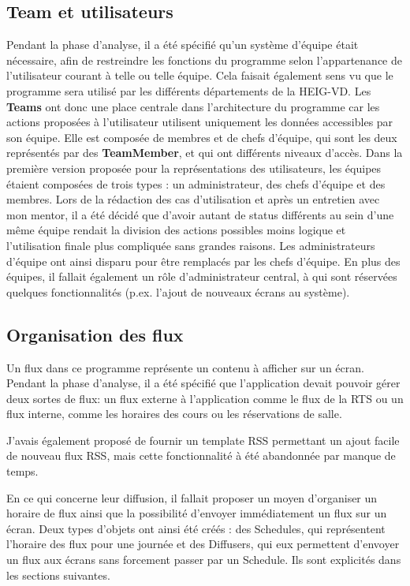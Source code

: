 \documentclass[french]{article}
\begin{document}
\subsection{Team et utilisateurs}
Pendant la phase d'analyse, il a été spécifié qu'un système d'équipe était nécessaire, afin de restreindre les fonctions du programme selon l'appartenance de l'utilisateur courant à telle ou telle équipe. Cela faisait également sens vu que le programme sera utilisé par les différents départements de la HEIG-VD.\newline
Les \textbf{Teams} ont donc une place centrale dans l'architecture du programme car les actions proposées à l'utilisateur utilisent uniquement les données accessibles par son équipe. Elle est composée de membres et de chefs d'équipe, qui sont les deux représentés par des \textbf{TeamMember}, et qui ont différents niveaux d'accès. \newline
Dans la première version proposée pour la représentations des utilisateurs, les équipes étaient composées de trois types : un administrateur, des chefs d'équipe et des membres. Lors de la rédaction des cas d'utilisation et après un entretien avec mon mentor, il a été décidé que d'avoir autant de status différents au sein d'une même équipe rendait la division des actions possibles moins logique et l'utilisation finale plus compliquée sans grandes raisons. Les administrateurs d'équipe ont ainsi disparu pour être remplacés par les chefs d'équipe.\newline
En plus des équipes, il fallait également un rôle d'administrateur central, à qui sont réservées quelques fonctionnalités (p.ex. l'ajout de nouveaux écrans au système).

\subsection{Organisation des flux}

Un flux dans ce programme représente un contenu à afficher sur un écran. Pendant la phase d'analyse, il a été spécifié que l'application devait pouvoir gérer deux sortes de flux: un flux externe à l'application comme le flux de la RTS ou un flux interne, comme les horaires des cours ou les réservations de salle. \newline

J'avais également proposé de fournir un template RSS permettant un ajout facile de nouveau flux RSS, mais cette fonctionnalité à été abandonnée par manque de temps.

En ce qui concerne leur diffusion, il fallait proposer un moyen d'organiser un horaire de flux ainsi que la possibilité d'envoyer immédiatement un flux sur un écran. Deux types d'objets ont ainsi été créés : des Schedules, qui représentent l'horaire des flux pour une journée et des Diffusers, qui eux permettent d'envoyer un flux aux écrans sans forcement passer par un Schedule. Ils sont explicités dans les sections suivantes.
\end{document}
